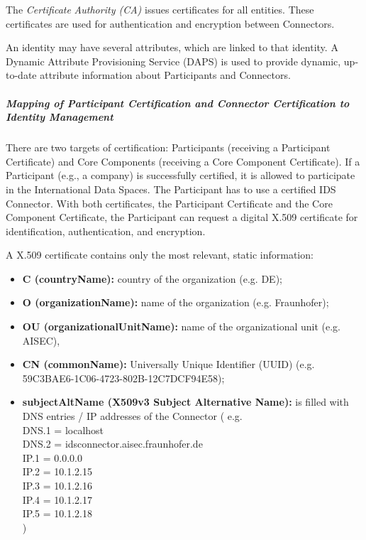 The \textit{Certificate} \textit{Authority (CA)} issues certificates for all entities. These certificates are used for authentication and encryption between Connectors.

An identity may have several attributes, which are linked to that identity. A Dynamic Attribute Provisioning Service (DAPS) is used to provide dynamic, up-to-date attribute information about Participants and Connectors.

\subparagraph*{Mapping of Participant Certification and Connector Certification to Identity Management\\}
There are two targets of certification: Participants (receiving a Participant Certificate) and Core Components (receiving a Core Component Certificate). If a Participant (e.g., a company) is successfully certified, it is allowed to participate in the International Data Spaces. The Participant has to use a certified IDS Connector. With both certificates, the Participant Certificate and the Core Component Certificate, the Participant can request a digital X.509 certificate for identification, authentication, and encryption.

A X.509 certificate contains only the most relevant, static information:

\begin{itemize}
	\item \textbf{C (countryName):} country of the organization (e.g. DE);

	\item \textbf{O (organizationName):} name of the organization (e.g. Fraunhofer); 

	\item \textbf{OU (organizationalUnitName):} name of the organizational unit (e.g. AISEC),

	\item \textbf{CN (commonName):} Universally Unique Identifier (UUID) (e.g. 59C3BAE6-1C06-4723-802B-12C7DCF94E58);


	\item \textbf{subjectAltName (X509v3 Subject Alternative Name):} is filled with DNS entries / IP addresses of the Connector ( e.g.\\
DNS.1 = localhost\\
DNS.2 = idsconnector.aisec.fraunhofer.de\\
IP.1 = 0.0.0.0\\
IP.2 = 10.1.2.15\\
IP.3 = 10.1.2.16\\
IP.4 = 10.1.2.17\\
IP.5 = 10.1.2.18\\
)
\end{itemize}


